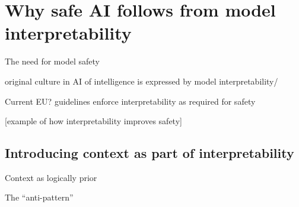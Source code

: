 %

\section{Why safe AI follows from model interpretability}

The need for model safety

original culture in AI of intelligence is expressed by model interpretability/

Current EU? guidelines enforce interpretability as required for safety

[example of how interpretability improves safety]

\subsection{Introducing context as part of interpretability}

Context as logically prior

The ``anti-pattern'' 